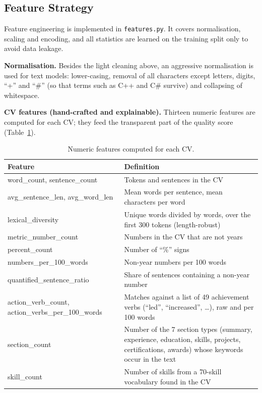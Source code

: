 \documentclass[11pt,a4paper]{article}
\begin{document}
\subsection{Feature Strategy}
\label{sec:features}

Feature engineering is implemented in \texttt{features.py}. It covers
normalisation, scaling and encoding, and all statistics are learned on
the training split only to avoid data leakage.

\textbf{Normalisation.} Besides the light cleaning above, an aggressive
normalisation is used for text models: lower-casing, removal of all
characters except letters, digits, ``+'' and ``\#'' (so that terms such
as C++ and C\# survive) and collapsing of whitespace.

\textbf{CV features (hand-crafted and explainable).} Thirteen numeric
features are computed for each CV; they feed the transparent part of the
quality score (Table~\ref{tab:cvfeatures}).

\begin{table}[htbp]
  \centering
  \footnotesize
  \begin{tabularx}{\textwidth}{@{}>{\ttfamily}l>{\raggedright\arraybackslash}X@{}}
    \toprule
    Feature & Definition \\
    \midrule
    word\_count, sentence\_count & Tokens and sentences in the CV \\
    avg\_sentence\_len, avg\_word\_len & Mean words per sentence, mean characters per word \\
    lexical\_diversity & Unique words divided by words, over the first 300 tokens (length-robust) \\
    metric\_number\_count & Numbers in the CV that are not years \\
    percent\_count & Number of ``\%'' signs \\
    numbers\_per\_100\_words & Non-year numbers per 100 words \\
    quantified\_sentence\_ratio & Share of sentences containing a non-year number \\
    action\_verb\_count, action\_verbs\_per\_100\_words & Matches against a list of 49 achievement verbs (``led'', ``increased'', \dots), raw and per 100 words \\
    section\_count & Number of the 7 section types (summary, experience, education, skills, projects, certifications, awards) whose keywords occur in the text \\
    skill\_count & Number of skills from a 70-skill vocabulary found in the CV \\
    \bottomrule
  \end{tabularx}
  \caption{Numeric features computed for each CV.}
  \label{tab:cvfeatures}
\end{table}
\end{document}
